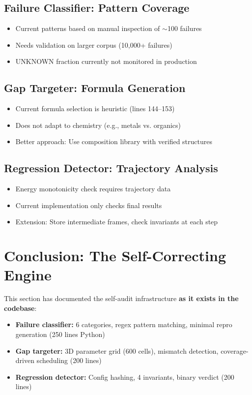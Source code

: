 \documentclass[11pt]{article}
\begin{document}
\subsection{Failure Classifier: Pattern Coverage}

\begin{itemize}
\item Current patterns based on manual inspection of $\sim$100 failures
\item Needs validation on larger corpus (10,000+ failures)
\item UNKNOWN fraction currently not monitored in production
\end{itemize}

\subsection{Gap Targeter: Formula Generation}

\begin{itemize}
\item Current formula selection is heuristic (lines 144--153)
\item Does not adapt to chemistry (e.g., metals vs. organics)
\item Better approach: Use composition library with verified structures
\end{itemize}

\subsection{Regression Detector: Trajectory Analysis}

\begin{itemize}
\item Energy monotonicity check requires trajectory data
\item Current implementation only checks final results
\item Extension: Store intermediate frames, check invariants at each step
\end{itemize}

\section{Conclusion: The Self-Correcting Engine}

This section has documented the self-audit infrastructure \textbf{as it exists in the codebase}:

\begin{itemize}
\item \textbf{Failure classifier:} 6 categories, regex pattern matching, minimal repro generation (250 lines Python)
\item \textbf{Gap targeter:} 3D parameter grid (600 cells), mismatch detection, coverage-driven scheduling (200 lines)
\item \textbf{Regression detector:} Config hashing, 4 invariants, binary verdict (200 lines)
\end{itemize}
\end{document}
